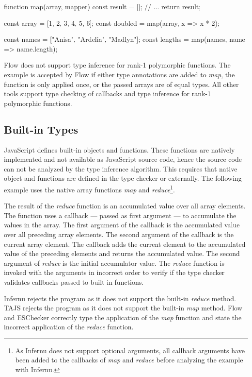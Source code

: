 \begin{javascriptcode}
function map(array, mapper) {
	const result = [];
	// ... 
	return result;
}

const array = [1, 2, 3, 4, 5, 6];
const doubled = map(array, x => x * 2);

const names = ["Anisa", "Ardelia", "Madlyn"];
const lengths = map(names, name => name.length);
\end{javascriptcode}

Flow does not support type inference for rank-1 polymorphic functions. The example is accepted by Flow if either type annotations are added to \textit{map}, the function is only applied once, or the passed arrays are of equal types. All other tools support type checking of callbacks and type inference for rank-1 polymorphic functions.

\subsection{Built-in Types}\label{ssec:built-in-types}
JavaScript defines built-in objects and functions. These functions are natively implemented and not available as JavaScript source code, hence the source code can not be analyzed by the type inference algorithm. This requires that native object and functions are defined in the type checker or externally. The following example uses the native array functions \textit{map} and \textit{reduce}\footnote{As Infernu does not support optional arguments, all callback arguments have been added to the callbacks of \textit{map} and \textit{reduce} before analyzing the example with Infernu.}. 

The result of the \textit{reduce} function is an accumulated value over all array elements. The function uses a callback --- passed as first argument --- to accumulate the values in the array. The first argument of the callback is the accumulated value over all preceding array elements. The second argument of the callback is the current array element. The callback adds the current element to the accumulated value of the preceding elements and returns the accumulated value. The second argument of \textit{reduce} is the initial accumulator value. The \textit{reduce} function is invoked with the arguments in incorrect order to verify if the type checker validates callbacks passed to built-in functions.


Infernu rejects the program as it does not support the built-in \textit{reduce} method. TAJS rejects the program as it does not support the built-in \textit{map} method. Flow and ESChecker correctly type the application of the \textit{map} function and state the incorrect application of the \textit{reduce} function.

